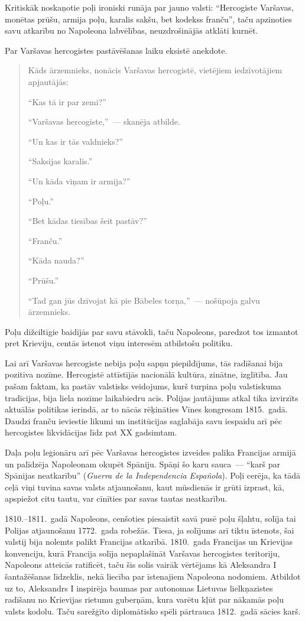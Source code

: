 \documentclass[twoside,a5paper,12pt,fleqn,openany]{extbook}
\newcommand{\estxti}[1]{\textit{\textspanish{#1}}}
\begin{document}
Kritiskāk noskaņotie poļi ironiski runāja par jauno valsti: ``Hercogiste Varšavas, monētas prūšu, armija poļu, karalis sakšu, bet kodekss franču'', taču apzinoties savu atkarību no Napoleona labvēlības, neuzdrošinājās atklāti kurnēt.

Par Varšavas hercogistes pastāvēšanas laiku eksistē anekdote.

\begin{quote}
Kāds ārzemnieks, nonācis Varšavas hercogistē, vietējiem iedzīvotājiem apjautājās:

``Kas tā ir par zemi?''

``Varšavas hercogiste,''~--- skanēja atbilde.

``Un kas ir tās valdnieks?''

``Saksijas karalis.''

``Un kāda viņam ir armija?''

``Poļu.''

``Bet kādas tiesības šeit pastāv?''

``Franču.''

``Kāda nauda?''

``Prūšu.''

``Tad gan jūs dzīvojat kā pie Bābeles torņa,''~--- nošūpoja galvu ārzemnieks.
\end{quote}


Poļu dižciltīgie baidījās par savu stāvokli, taču Napoleons, paredzot tos izmantot pret Krieviju, centās īstenot viņu interesēm atbilstošu politiku.

Lai arī Varšavas hercogiste nebija poļu sapņu piepildījums, tās radīšanai bija pozitīva nozīme. Hercogistē attīstījās nacionālā kultūra, zinātne, izglītība. Jau pašam faktam, ka pastāv valstisks veidojums, kurš turpina poļu valstiskuma tradīcijas, bija liela nozīme laikabiedru acīs. Polijas jautājums atkal tika izvirzīts aktuālās politikas ierindā, ar to nācās rēķināties Vīnes kongresam 1815.~gadā. Daudzi franču ieviestie likumi un institūcijas saglabāja savu iespaidu arī pēc hercogistes likvidācijas līdz pat XX gadsimtam.

Daļa poļu leģionāru arī pēc Varšavas hercogistes izveides palika Francijas armijā un palīdzēja Napoleonam okupēt Spāniju. Spāņi šo karu sauca~--- ``karš par Spānijas neatkarību'' (\estxti{Guerra de la Independencia Española}). Poļi cerēja, ka tādā ceļā viņi tuvina savas valsts atjaunošanu, kaut mūsdienās ir grūti izprast, kā, apspiežot citu tautu, var cīnīties par savas tautas neatkarību.

1810.--1811.~gadā Napoleons, cenšoties piesaistīt savā pusē poļu šļahtu, solīja tai Polijas atjaunošanu 1772.~gada robežās. Tiesa, ja solījums arī tiktu īstenots, šai valstij bija nolemts palikt Francijas atkarībā. 1810.~gada Francijas un Krievijas konvenciju, kurā Francija solīja nepaplašināt Varšavas hercogistes teritoriju, Napoleons atteicās ratificēt, taču šis solis vairāk vērtējams kā Aleksandra I šantažēšanas līdzeklis, nekā liecība par īstenajiem Napoleona nodomiem. Atbildot uz to, Aleksandrs I inspirēja baumas par autonomas Lietuvas lielkņazistes radīšanu no Krievijas rietumu guberņām, kura varētu kļūt par nākamās poļu valsts kodolu. Taču sarežģīto diplomātisko spēli pārtrauca 1812.~gadā sācies karš.
\end{document}
